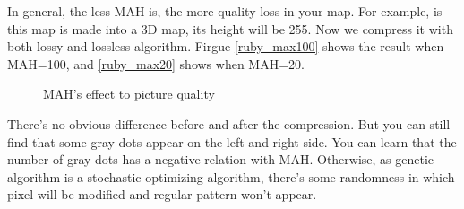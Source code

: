 \documentclass{article}
\begin{document}
    In general, the less MAH is, the more quality loss in your map. For example, is this map is made into a 3D map, its height will be 255. Now we compress it with both lossy and lossless algorithm. Firgue \ref*{ruby_max100} shows the result when MAH=100, and \ref*{ruby_max20} shows when MAH=20.

    \begin{figure}[htbp]
        \centering
        \caption{MAH's effect to picture quality}
    \end{figure}

    There's no obvious difference before and after the compression. But you can still find that some gray dots appear on the left and right side. You can learn that the number of gray dots has a negative relation with MAH. Otherwise, as genetic algorithm is a stochastic optimizing algorithm, there's some randomness in which pixel will be modified and regular pattern won't appear.
\end{document}

